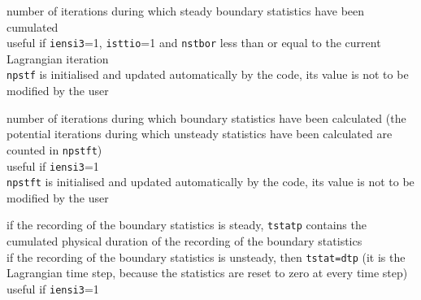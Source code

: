 {number of iterations during which steady boundary statistics have
been cumulated\\
useful if \texttt{iensi3}=1, \texttt{isttio}=1 and \texttt{nstbor} less than
or equal to the current Lagrangian iteration\\
\texttt{npstf} is initialised and updated automatically by the code,
its value is not to be modified by the user}

{number of iterations during which boundary statistics have
been calculated
(the potential iterations during which unsteady
statistics have been calculated are counted in \texttt{npstft})\\
useful if \texttt{iensi3}=1\\
\texttt{npstft} is initialised and updated automatically by the code,
its value is not to be modified by the user}

{if the recording of the boundary statistics is steady, \texttt{tstatp}
contains the cumulated physical duration of the recording of the boundary
statistics\\
if the recording of the boundary statistics is unsteady, then
\texttt{tstat=dtp} (it is the Lagrangian time step, because the
statistics are reset to zero at every time step)\\
useful if \texttt{iensi3}=1}
